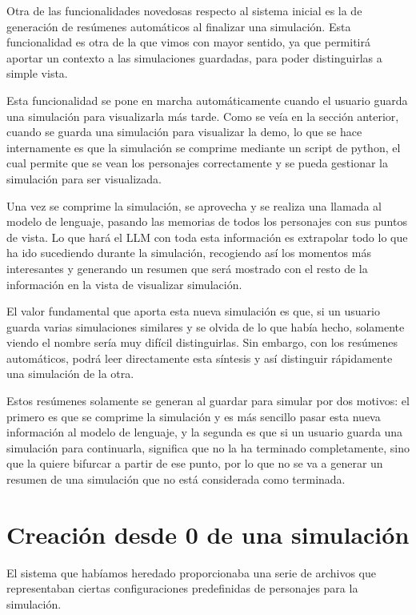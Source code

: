Otra de las funcionalidades novedosas respecto al sistema inicial es la de generación de resúmenes automáticos al finalizar una simulación. Esta funcionalidad es otra de la que vimos con mayor sentido, ya que permitirá aportar un contexto a las simulaciones guardadas, para poder distinguirlas a simple vista.

Esta funcionalidad se pone en marcha automáticamente cuando el usuario guarda una simulación para visualizarla más tarde. Como se veía en la sección anterior, cuando se guarda una simulación para visualizar la demo, lo que se hace internamente es que la simulación se comprime mediante un script de python, el cual permite que se vean los personajes correctamente y se pueda gestionar la simulación para ser visualizada.

Una vez se comprime la simulación, se aprovecha y se realiza una llamada al modelo de lenguaje, pasando las memorias de todos los personajes con sus puntos de vista. Lo que hará el LLM con toda esta información es extrapolar todo lo que ha ido sucediendo durante la simulación, recogiendo así los momentos más interesantes y generando un resumen que será mostrado con el resto de la información en la vista de visualizar simulación.

El valor fundamental que aporta esta nueva simulación es que, si un usuario guarda varias simulaciones similares y se olvida de lo que había hecho, solamente viendo el nombre sería muy difícil distinguirlas. Sin embargo, con los resúmenes automáticos, podrá leer directamente esta síntesis y así distinguir rápidamente una simulación de la otra.

Estos resúmenes solamente se generan al guardar para simular por dos motivos: el primero es que se comprime la simulación y es más sencillo pasar esta nueva información al modelo de lenguaje, y la segunda es que si un usuario guarda una simulación para continuarla, significa que no la ha terminado completamente, sino que la quiere bifurcar a partir de ese punto, por lo que no se va a generar un resumen de una simulación que no está considerada como terminada.

\section{Creación desde 0 de una simulación}

El sistema que habíamos heredado proporcionaba una serie de archivos que representaban ciertas configuraciones predefinidas de personajes para la simulación.

